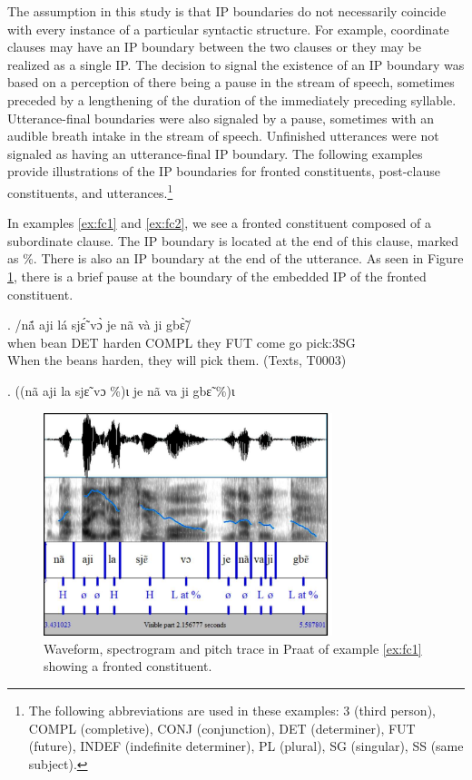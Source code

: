 \documentclass[
  11pt,
  b5paper,
]{article}
\begin{document}
The assumption in this study is that IP boundaries do not necessarily
coincide with every instance of a particular syntactic structure. For
example, coordinate clauses may have an IP boundary between the two
clauses or they may be realized as a single IP. The decision to signal
the existence of an IP boundary was based on a perception of there being
a pause in the stream of speech, sometimes preceded by a lengthening of
the duration of the immediately preceding syllable. Utterance-final
boundaries were also signaled by a pause, sometimes with an audible
breath intake in the stream of speech. Unfinished utterances were not
signaled as having an utterance-final IP boundary. The following
examples provide illustrations of the IP boundaries for fronted
constituents, post-clause constituents, and utterances.\footnote{The
  following abbreviations are used in these examples: 3 (third person),
  COMPL (completive), CONJ (conjunction), DET (determiner), FUT
  (future), INDEF (indefinite determiner), PL (plural), SG (singular),
  SS (same subject).}

In examples \ref{ex:fc1} and \ref{ex:fc2}, we see a fronted constituent
composed of a subordinate clause. The IP boundary is located at the end
of this clause, marked as \%. There is also an IP boundary at the end of
the utterance. As seen in Figure \ref{fig:fc1}, there is a brief pause
at the boundary of the embedded IP of the fronted constituent.

\exg. \label{ex:fc1}/nã́ aji lá sjɛ̃́ vɔ̀ je nã và ji gbɛ̃̀/\\
when bean DET harden COMPL they FUT come go pick:3SG\\
When the beans harden, they will pick them. (Texts, T0003)

\ex. \label{ex:fc2}((nã aji la sjɛ̃ vɔ \%)ɩ je nã va ji gbɛ̃ \%)ɩ

\begin{figure}
\centering
\includegraphics[width=0.75\textwidth,height=0.75\textheight]{figure/fronted-constituent-boundary.pdf}
\caption{Waveform, spectrogram and pitch trace in Praat of example
\ref{ex:fc1} showing a fronted constituent.\label{fig:fc1}}
\end{figure}
\end{document}
